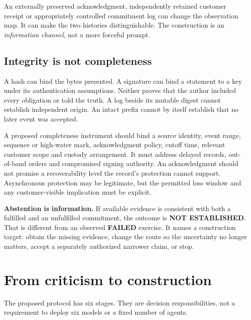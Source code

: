 \documentclass[11pt,a4paper]{article}
\newcommand{\status}[1]{\textsf{\textbf{#1}}}
\begin{document}
An externally preserved acknowledgment, independently retained customer receipt or appropriately controlled commitment log can change the observation map. It can make the two histories distinguishable. The construction is an \emph{information channel}, not a more forceful prompt.

\subsection{Integrity is not completeness}
A hash can bind the bytes presented. A signature can bind a statement to a key under its authentication assumptions. Neither proves that the author included every obligation or told the truth. A log beside its mutable digest cannot establish independent origin. An intact prefix cannot by itself establish that no later event was accepted.

A proposed completeness instrument should bind a source identity, event range, sequence or high-water mark, acknowledgment policy, cutoff time, relevant customer scope and custody arrangement. It must address delayed records, out-of-band orders and compromised signing authority. An acknowledgment should not promise a recoverability level the record's protection cannot support. Asynchronous protection may be legitimate, but the permitted loss window and any customer-visible implication must be explicit.

\begin{scopebox}
\textbf{Abstention is information.} If available evidence is consistent with both a fulfilled and an unfulfilled commitment, the outcome is \status{NOT ESTABLISHED}. That is different from an observed \status{FAILED} exercise. It names a construction target: obtain the missing evidence, change the route so the uncertainty no longer matters, accept a separately authorized narrower claim, or stop.
\end{scopebox}

\section{From criticism to construction}\label{sec:protocol}
The proposed protocol has six stages. They are decision responsibilities, not a requirement to deploy six models or a fixed number of agents.
\end{document}
